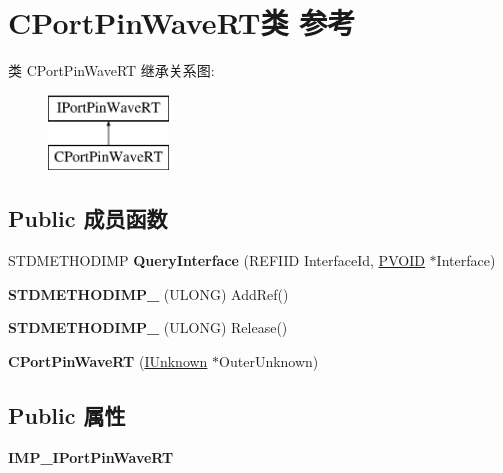 \hypertarget{class_c_port_pin_wave_r_t}{}\section{C\+Port\+Pin\+Wave\+R\+T类 参考}
\label{class_c_port_pin_wave_r_t}
类 C\+Port\+Pin\+Wave\+RT 继承关系图\+:\begin{figure}[H]
\begin{center}
\leavevmode
\includegraphics[height=2.000000cm]{class_c_port_pin_wave_r_t}
\end{center}
\end{figure}
\subsection*{Public 成员函数}
\begin{DoxyCompactItemize}
\item 
\mbox{\label{class_c_port_pin_wave_r_t_a94a4a11fc9f9703714519e7b423d0fc7}} 
S\+T\+D\+M\+E\+T\+H\+O\+D\+I\+MP {\bfseries Query\+Interface} (R\+E\+F\+I\+ID Interface\+Id, \hyperlink{interfacevoid}{P\+V\+O\+ID} $\ast$Interface)
\item 
\mbox{\label{class_c_port_pin_wave_r_t_a2b3e4cbe879345cc454266c46c7dfb4a}} 
{\bfseries S\+T\+D\+M\+E\+T\+H\+O\+D\+I\+M\+P\+\_\+} (U\+L\+O\+NG) Add\+Ref()
\item 
\mbox{\label{class_c_port_pin_wave_r_t_a88a983a8fad0ab4fa9dba38245896c8d}} 
{\bfseries S\+T\+D\+M\+E\+T\+H\+O\+D\+I\+M\+P\+\_\+} (U\+L\+O\+NG) Release()
\item 
\mbox{\label{class_c_port_pin_wave_r_t_a56d82541aec2be1e18715f0b6f1dad69}} 
{\bfseries C\+Port\+Pin\+Wave\+RT} (\hyperlink{interface_i_unknown}{I\+Unknown} $\ast$Outer\+Unknown)
\end{DoxyCompactItemize}
\subsection*{Public 属性}
\begin{DoxyCompactItemize}
\item 
\mbox{\label{class_c_port_pin_wave_r_t_ae811eabd0ef3060f0a04455422bf7de9}} 
{\bfseries I\+M\+P\+\_\+\+I\+Port\+Pin\+Wave\+RT}
\end{DoxyCompactItemize}
